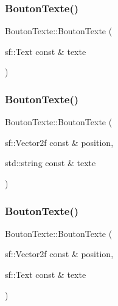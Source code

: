 \mbox{\label{classBoutonTexte_ae0a1e9127faeb62d40138da1c2930702}} 
\subsubsection{\texorpdfstring{Bouton\+Texte()}{BoutonTexte()}\hspace{0.1cm}{\footnotesize\ttfamily [4/8]}}
{\footnotesize\ttfamily Bouton\+Texte\+::\+Bouton\+Texte (\begin{DoxyParamCaption}\item[{sf\+::\+Text const \&}]{texte }\end{DoxyParamCaption})}

\mbox{\label{classBoutonTexte_a181207cd9efb02368cafec0a07eba955}} 
\subsubsection{\texorpdfstring{Bouton\+Texte()}{BoutonTexte()}\hspace{0.1cm}{\footnotesize\ttfamily [5/8]}}
{\footnotesize\ttfamily Bouton\+Texte\+::\+Bouton\+Texte (\begin{DoxyParamCaption}\item[{sf\+::\+Vector2f const \&}]{position,  }\item[{std\+::string const \&}]{texte }\end{DoxyParamCaption})}

\mbox{\label{classBoutonTexte_ae1346a4ba4971549fee0e73a9d1b23cd}} 
\subsubsection{\texorpdfstring{Bouton\+Texte()}{BoutonTexte()}\hspace{0.1cm}{\footnotesize\ttfamily [6/8]}}
{\footnotesize\ttfamily Bouton\+Texte\+::\+Bouton\+Texte (\begin{DoxyParamCaption}\item[{sf\+::\+Vector2f const \&}]{position,  }\item[{sf\+::\+Text const \&}]{texte }\end{DoxyParamCaption})}

